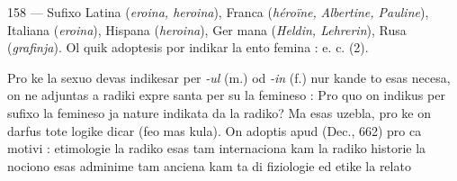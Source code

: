 \begin{VUpage}[162]{158}
 --- Sufixo Latina (\textit{eroina, heroina}), Franca (\textit{héroïne,}\nl
\textit{Albertine, Pauline}), Italiana (\textit{eroina}), Hispana (\textit{heroina}), Ger\cc
mana (\textit{Heldin, Lehrerin}), Rusa (\textit{grafinja}). Ol quik adoptesis\nl
por indikar la ento femina : \nl
{} e. c. (2).

Pro ke la sexuo devas indikesar per \textit{-ul} (m.) od \textit{-in} (f.)\nl
nur kande to esas necesa, on ne adjuntas  a radiki expre\cc
santa per su la femineso : \nl
{} Pro quo on indikus per sufixo la\nl
femineso ja nature indikata da la radiko? Ma  esas\nl
uzebla, pro ke on darfus tote logike dicar  (feo mas\cc
kula). On adoptis  apud  (Dec., 662) pro ca\nl
motivi : etimologie la radiko  esas tam internaciona\nl
kam la radiko  historie la nociono  esas adminime\nl
tam anciena kam ta di  fiziologie ed etike la relato\parplein
\end{VUpage}

